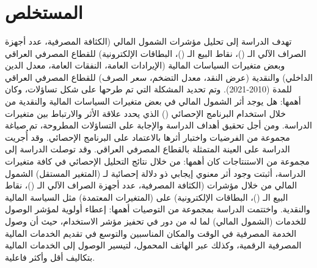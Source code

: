 \documentclass[10pt,a4paper]{report}
\newcommand{\myspace}{\hspace*{1cm}}
\begin{document}
\begin{doublespacing}
\section*{}
\thispagestyle{plain} %
\begin{center}
	\huge\centering{}\\
	\huge\centering{}\\
	\bigskip
	\bigskip
	\bigskip
	\bigskip
	\bigskip
\end{center}
\begin{flushleft}
\large{}\\
\large{}
\end{flushleft}
\newpage
\section*{\centering المستخلص}
\thispagestyle{plain}
\myspace 
تهدف الدراسة إلى تحليل مؤشرات الشمول المالي (الكثافة المصرفية، عدد أجهزة الصراف الآلي الـ ()، نقاط البيع الـ ()، البطاقات الإلكترونية) للقطاع المصرفي العراقي وبعض متغيرات السياسات المالية (الإيرادات العامة، النفقات العامة، معدل الدين الداخلي) والنقدية (عرض النقد، معدل التضخم، سعر الصرف) للقطاع المصرفي العراقي للمدة (2010-2021). وتم تحديد المشكلة التي تم طرحها على شكل تساؤلات، وكان أهمها: هل يوجد أثر الشمول المالي في بعض متغيرات السياسات المالية والنقدية من خلال استخدام البرنامج الإحصائي () الذي يحدد علاقة الأثر والارتباط بين متغيرات الدراسة. ومن أجل تحقيق أهداف الدراسة والإجابة على التساؤلات المطروحة، تم صياغة مجموعة من الفرضيات واختبار أثرها بالاعتماد على البرنامج الإحصائي. وقد أُجريت الدراسة على العينة المتمثلة بالقطاع المصرفي العراقي. وقد توصلت الدراسة إلى مجموعة من الاستنتاجات كان أهمها: من خلال نتائج التحليل الإحصائي في كافة متغيرات الدراسة، أثبتت وجود أثر معنوي إيجابي ذو دلالة إحصائية لـ (المتغير المستقل) الشمول المالي من خلال مؤشرات (الكثافة المصرفية، عدد أجهزة الصراف الآلي الـ ()، نقاط البيع الـ ()، البطاقات الإلكترونية) على (المتغيرات المعتمدة) مثل السياسة المالية والنقدية. واختتمت الدراسة بمجموعة من التوصيات أهمها: إعطاء أولوية لمؤشر الوصول للخدمات (الشمول المالي) لما له من دور في تحفيز مؤشر الاستخدام، حيث أن وصول الخدمة المصرفية في الوقت والمكان المناسبين والتوسع في تقديم الخدمات المالية المصرفية الرقمية، وكذلك عبر الهاتف المحمول، لتيسير الوصول إلى الخدمات المالية بتكاليف أقل وأكثر فاعلية.
\bigskip
\bigskip
\bigskip


\end{doublespacing}
\end{document}

